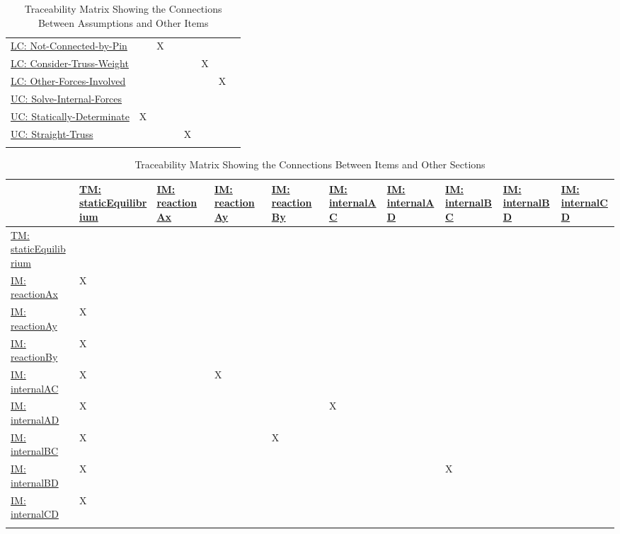 \documentclass[12pt]{article}
\begin{document}
\begin{longtable}{l l l l l l l l}
\\
\hyperref[likeChgNCbP]{LC: Not-Connected-by-Pin} &  & X &  &  &  &  & 
\\
\hyperref[likeChgWoT]{LC: Consider-Truss-Weight} &  &  &  &  & X &  & 
\\
\hyperref[likeChgOtherF]{LC: Other-Forces-Involved} &  &  &  &  &  & X & 
\\
\hyperref[unlikeChgSIF]{UC: Solve-Internal-Forces} &  &  &  &  &  &  & 
\\
\hyperref[unlikeChgStatD]{UC: Statically-Determinate} & X &  &  &  &  &  & 
\\
\hyperref[unlikeChgST]{UC: Straight-Truss} &  &  &  & X &  &  & 
\\
\bottomrule
\caption{Traceability Matrix Showing the Connections Between Assumptions and Other Items}
\label{Table:TraceMatAvsAll}
\end{longtable}
\begin{longtable}{l l l l l l l l l l}
\toprule
\textbf{} & \textbf{\hyperref[TM:staticEquilibrium]{TM: staticEquilibrium}} & \textbf{\hyperref[IM:reactionAx]{IM: reactionAx}} & \textbf{\hyperref[IM:reactionAy]{IM: reactionAy}} & \textbf{\hyperref[IM:reactionBy]{IM: reactionBy}} & \textbf{\hyperref[IM:internalAC]{IM: internalAC}} & \textbf{\hyperref[IM:internalAD]{IM: internalAD}} & \textbf{\hyperref[IM:internalBC]{IM: internalBC}} & \textbf{\hyperref[IM:internalBD]{IM: internalBD}} & \textbf{\hyperref[IM:internalCD]{IM: internalCD}}
\\
\midrule
\endhead
\hyperref[TM:staticEquilibrium]{TM: staticEquilibrium} &  &  &  &  &  &  &  &  & 
\\
\hyperref[IM:reactionAx]{IM: reactionAx} & X &  &  &  &  &  &  &  & 
\\
\hyperref[IM:reactionAy]{IM: reactionAy} & X &  &  &  &  &  &  &  & 
\\
\hyperref[IM:reactionBy]{IM: reactionBy} & X &  &  &  &  &  &  &  & 
\\
\hyperref[IM:internalAC]{IM: internalAC} & X &  & X &  &  &  &  &  & 
\\
\hyperref[IM:internalAD]{IM: internalAD} & X &  &  &  & X &  &  &  & 
\\
\hyperref[IM:internalBC]{IM: internalBC} & X &  &  & X &  &  &  &  & 
\\
\hyperref[IM:internalBD]{IM: internalBD} & X &  &  &  &  &  & X &  & 
\\
\hyperref[IM:internalCD]{IM: internalCD} & X &  &  &  &  &  &  &  & 
\\
\bottomrule
\caption{Traceability Matrix Showing the Connections Between Items and Other Sections}
\label{Table:TraceMatRefvsRef}
\end{longtable}
\end{document}
